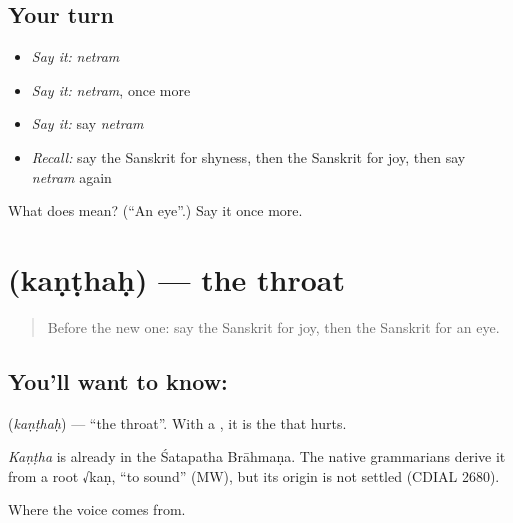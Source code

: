 \subsection*{Your turn}
\begin{itemize}
\raggedright
  \item \emph{Say it:} \emph{netram}
  \item \emph{Say it:} \emph{netram}, once more
  \item \emph{Say it:} say \emph{netram}
  \item \emph{Recall:} say the Sanskrit for shyness, then the Sanskrit for joy, then say \emph{netram} again
\end{itemize}

\begin{tcolorbox}[breakable,colback=teal!4,colframe=teal!35!black,title={Before you move on}]
What does  mean? (\textquotedblleft{}An eye\textquotedblright{}.) Say it once more.
\end{tcolorbox}
\section[\texorpdfstring{\sk{कण्ठः} (kaṇṭhaḥ)}{कण्ठः (kaṇṭhaḥ)}]{ (kaṇṭhaḥ) — the throat}

\label{lesson:SA-C69-throat}



\begin{quote}
Before the new one: say the Sanskrit for joy, then the Sanskrit for an eye.
\end{quote}

\subsection*{You'll want to know: }
\textbf{} (\emph{kaṇṭhaḥ}) — \textquotedblleft{}the throat\textquotedblright{}. With a \textbf{}, it is the \textbf{} that hurts.

\begin{cousinweb}
\emph{Kaṇṭha} is already in the Śatapatha Brāhmaṇa. The native grammarians derive it from a root √kaṇ, \textquotedblleft{}to sound\textquotedblright{} (MW), but its origin is not settled (CDIAL 2680).
\end{cousinweb}

\begin{grammarlens}[title={What you've built}]
Where the voice comes from.
\end{grammarlens}

